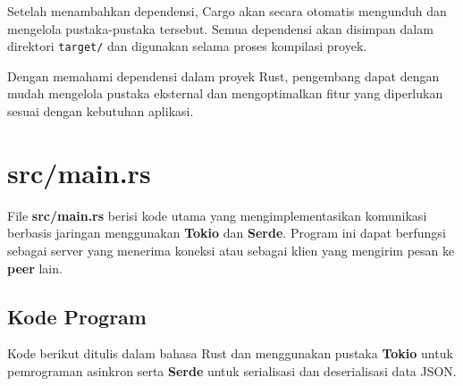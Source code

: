 Setelah menambahkan dependensi, Cargo akan secara otomatis mengunduh dan mengelola pustaka-pustaka tersebut. Semua dependensi akan disimpan dalam direktori \texttt{target/} dan digunakan selama proses kompilasi proyek.

Dengan memahami dependensi dalam proyek Rust, pengembang dapat dengan mudah mengelola pustaka eksternal dan mengoptimalkan fitur yang diperlukan sesuai dengan kebutuhan aplikasi.

\section{src/main.rs}

File \textbf{src/main.rs} berisi kode utama yang mengimplementasikan komunikasi berbasis jaringan menggunakan \textbf{Tokio} dan \textbf{Serde}. Program ini dapat berfungsi sebagai server yang menerima koneksi atau sebagai klien yang mengirim pesan ke \textbf{peer} lain.

\subsection{Kode Program}
Kode berikut ditulis dalam bahasa Rust dan menggunakan pustaka \textbf{Tokio} untuk pemrograman asinkron serta \textbf{Serde} untuk serialisasi dan deserialisasi data JSON.

